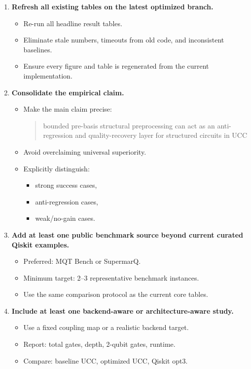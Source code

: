 \documentclass[11pt]{article}
\begin{document}
\begin{enumerate}
    \item \textbf{Refresh all existing tables on the latest optimized branch.}
    \begin{itemize}
        \item Re-run all headline result tables.
        \item Eliminate stale numbers, timeouts from old code, and inconsistent baselines.
        \item Ensure every figure and table is regenerated from the current implementation.
    \end{itemize}

    \item \textbf{Consolidate the empirical claim.}
    \begin{itemize}
        \item Make the main claim precise:
        \begin{quote}
        bounded pre-basis structural preprocessing can act as an anti-regression and quality-recovery layer for structured circuits in UCC
        \end{quote}
        \item Avoid overclaiming universal superiority.
        \item Explicitly distinguish:
        \begin{itemize}
            \item strong success cases,
            \item anti-regression cases,
            \item weak/no-gain cases.
        \end{itemize}
    \end{itemize}

    \item \textbf{Add at least one public benchmark source beyond current curated Qiskit examples.}
    \begin{itemize}
        \item Preferred: MQT Bench or SupermarQ.
        \item Minimum target: 2--3 representative benchmark instances.
        \item Use the same comparison protocol as the current core tables.
    \end{itemize}

    \item \textbf{Include at least one backend-aware or architecture-aware study.}
    \begin{itemize}
        \item Use a fixed coupling map or a realistic backend target.
        \item Report: total gates, depth, 2-qubit gates, runtime.
        \item Compare: baseline UCC, optimized UCC, Qiskit opt3.
    \end{itemize}


\end{enumerate}
\end{document}
